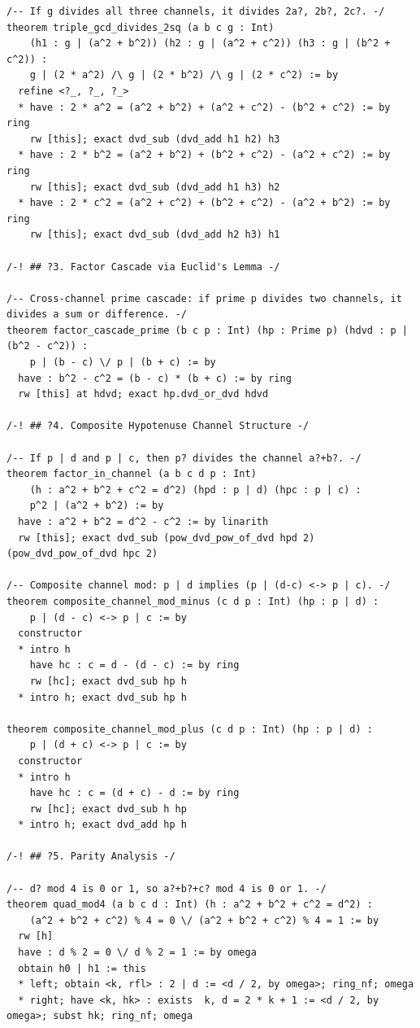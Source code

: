 \documentclass[11pt,twoside,openright]{book}
\theoremstyle{definition}
\theoremstyle{remark}
\begin{document}
\begin{lstlisting}[style=lean]
/-- If g divides all three channels, it divides 2a?, 2b?, 2c?. -/
theorem triple_gcd_divides_2sq (a b c g : Int)
    (h1 : g | (a^2 + b^2)) (h2 : g | (a^2 + c^2)) (h3 : g | (b^2 + c^2)) :
    g | (2 * a^2) /\ g | (2 * b^2) /\ g | (2 * c^2) := by
  refine <?_, ?_, ?_>
  * have : 2 * a^2 = (a^2 + b^2) + (a^2 + c^2) - (b^2 + c^2) := by ring
    rw [this]; exact dvd_sub (dvd_add h1 h2) h3
  * have : 2 * b^2 = (a^2 + b^2) + (b^2 + c^2) - (a^2 + c^2) := by ring
    rw [this]; exact dvd_sub (dvd_add h1 h3) h2
  * have : 2 * c^2 = (a^2 + c^2) + (b^2 + c^2) - (a^2 + b^2) := by ring
    rw [this]; exact dvd_sub (dvd_add h2 h3) h1

/-! ## ?3. Factor Cascade via Euclid's Lemma -/

/-- Cross-channel prime cascade: if prime p divides two channels, it divides a sum or difference. -/
theorem factor_cascade_prime (b c p : Int) (hp : Prime p) (hdvd : p | (b^2 - c^2)) :
    p | (b - c) \/ p | (b + c) := by
  have : b^2 - c^2 = (b - c) * (b + c) := by ring
  rw [this] at hdvd; exact hp.dvd_or_dvd hdvd

/-! ## ?4. Composite Hypotenuse Channel Structure -/

/-- If p | d and p | c, then p? divides the channel a?+b?. -/
theorem factor_in_channel (a b c d p : Int)
    (h : a^2 + b^2 + c^2 = d^2) (hpd : p | d) (hpc : p | c) :
    p^2 | (a^2 + b^2) := by
  have : a^2 + b^2 = d^2 - c^2 := by linarith
  rw [this]; exact dvd_sub (pow_dvd_pow_of_dvd hpd 2) (pow_dvd_pow_of_dvd hpc 2)

/-- Composite channel mod: p | d implies (p | (d-c) <-> p | c). -/
theorem composite_channel_mod_minus (c d p : Int) (hp : p | d) :
    p | (d - c) <-> p | c := by
  constructor
  * intro h
    have hc : c = d - (d - c) := by ring
    rw [hc]; exact dvd_sub hp h
  * intro h; exact dvd_sub hp h

theorem composite_channel_mod_plus (c d p : Int) (hp : p | d) :
    p | (d + c) <-> p | c := by
  constructor
  * intro h
    have hc : c = (d + c) - d := by ring
    rw [hc]; exact dvd_sub h hp
  * intro h; exact dvd_add hp h

/-! ## ?5. Parity Analysis -/

/-- d? mod 4 is 0 or 1, so a?+b?+c? mod 4 is 0 or 1. -/
theorem quad_mod4 (a b c d : Int) (h : a^2 + b^2 + c^2 = d^2) :
    (a^2 + b^2 + c^2) % 4 = 0 \/ (a^2 + b^2 + c^2) % 4 = 1 := by
  rw [h]
  have : d % 2 = 0 \/ d % 2 = 1 := by omega
  obtain h0 | h1 := this
  * left; obtain <k, rfl> : 2 | d := <d / 2, by omega>; ring_nf; omega
  * right; have <k, hk> : exists  k, d = 2 * k + 1 := <d / 2, by omega>; subst hk; ring_nf; omega


\end{lstlisting}
\end{document}
